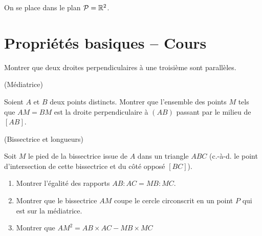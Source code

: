 \documentclass[a4paper,11pt,reqno]{amsart}
\begin{document}

\begin{convention}
  On se place dans le plan $\mathcal{P}=\mathbb{R}^2$.
\end{convention}

\section{Propriétés basiques -- Cours}


\begin{exo}

  Montrer que deux droites perpendiculaires à une troisième sont parallèles.
\end{exo}

\begin{exo} (Médiatrice)

  Soient $A$ et $B$ deux points distincts. Montrer que l'ensemble des points $M$ tels que $AM=BM$ est la droite perpendiculaire à $(AB)$ passant par le milieu de $[AB]$.
\end{exo}

\begin{exo} (Bissectrice et longueurs)

  Soit $M$ le pied de la bissectrice issue de $A$ dans un triangle $ABC$ (c.-à-d. le point d'intersection de cette bissectrice et du côté opposé $[BC]$).
  \begin{enumerate}
    \item Montrer l'égalité des rapports $AB:AC=MB:MC$.
    \item Montrer que le bissectrice $AM$ coupe le cercle circonscrit en un point $P$ qui est sur la médiatrice.
    \item Montrer que $AM^{2} = AB \times AC - MB \times MC$
  \end{enumerate}
\end{exo}
\end{document}
